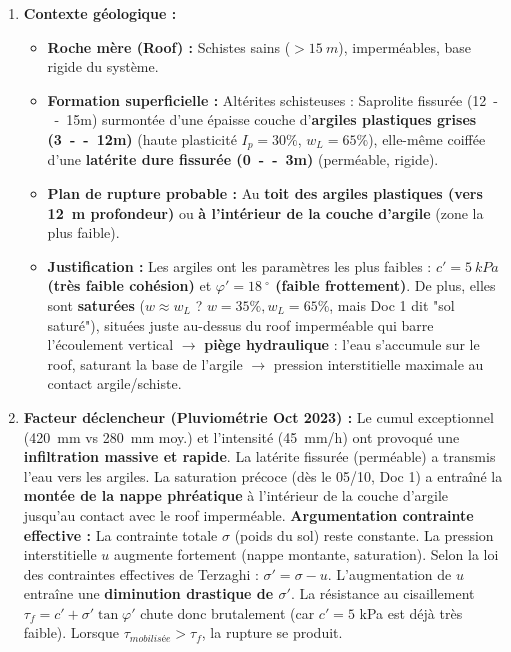 \documentclass[11pt]{article}
\providecommand{\degree}{^{\circ}}
\begin{document}
\begin{exercice}
\begin{enumerate}
\item \textbf{Contexte géologique :}
      \begin{itemize}
      \item \textbf{Roche mère (Roof) :} Schistes sains ($> \SI{15}{m}$), imperméables, base rigide du système.
      \item \textbf{Formation superficielle :} Altérites schisteuses : Saprolite fissurée (\SI{12}{--15}{m}) surmontée d'une épaisse couche d'\textbf{argiles plastiques grises (\SI{3}{--12}{m})} (haute plasticité $I_p=30\%$, $w_L=65\%$), elle-même coiffée d'une \textbf{latérite dure fissurée (\SI{0}{--3}{m})} (perméable, rigide).
      \item \textbf{Plan de rupture probable :} Au \textbf{toit des argiles plastiques (vers \SI{12}{m} profondeur)} ou \textbf{à l'intérieur de la couche d'argile} (zone la plus faible).
      \item \textbf{Justification :} Les argiles ont les paramètres les plus faibles : \textbf{$c' = \SI{5}{kPa}$ (très faible cohésion)} et \textbf{$\varphi' = \SI{18}{\degree}$ (faible frottement)}. De plus, elles sont \textbf{saturées} ($w \approx w_L$ ? $w=35\%, w_L=65\%$, mais Doc 1 dit "sol saturé"), situées juste au-dessus du roof imperméable qui barre l'écoulement vertical $\rightarrow$ \textbf{piège hydraulique} : l'eau s'accumule sur le roof, saturant la base de l'argile $\rightarrow$ pression interstitielle maximale au contact argile/schiste.
      \end{itemize}
\item \textbf{Facteur déclencheur (Pluviométrie Oct 2023) :}
      Le cumul exceptionnel (\SI{420}{mm} vs \SI{280}{mm} moy.) et l'intensité (\SI{45}{mm/h}) ont provoqué une \textbf{infiltration massive et rapide}. La latérite fissurée (perméable) a transmis l'eau vers les argiles. La saturation précoce (dès le 05/10, Doc 1) a entraîné la \textbf{montée de la nappe phréatique} à l'intérieur de la couche d'argile jusqu'au contact avec le roof imperméable.
      \textbf{Argumentation contrainte effective :} La contrainte totale $\sigma$ (poids du sol) reste constante. La pression interstitielle $u$ augmente fortement (nappe montante, saturation). Selon la loi des contraintes effectives de Terzaghi : $\sigma' = \sigma - u$. L'augmentation de $u$ entraîne une \textbf{diminution drastique de $\sigma'$}. La résistance au cisaillement $\tau_f = c' + \sigma' \tan\varphi'$ chute donc brutalement (car $c'=5$ kPa est déjà très faible). Lorsque $\tau_{mobilisée} > \tau_f$, la rupture se produit.

\end{enumerate}
\end{exercice}
\end{document}
